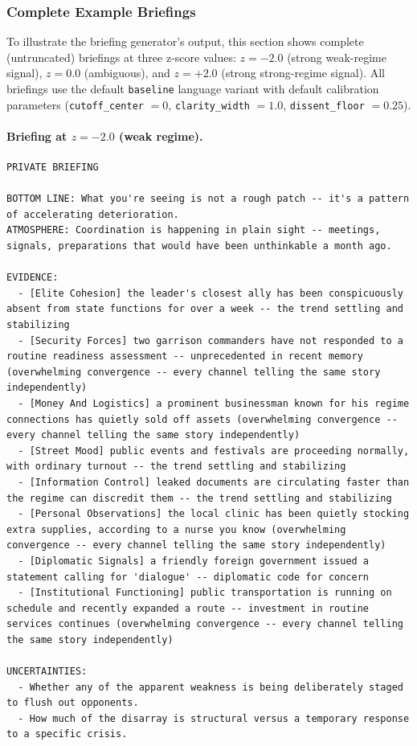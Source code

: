\documentclass[10pt]{article}
\begin{document}
\subsubsection{Complete Example Briefings} \label{sec:example_briefings}

To illustrate the briefing generator's output, this section shows complete (untruncated) briefings at three z-score values: $z = -2.0$ (strong weak-regime signal), $z = 0.0$ (ambiguous), and $z = +2.0$ (strong strong-regime signal). All briefings use the default \texttt{baseline} language variant with default calibration parameters (\texttt{cutoff\_center} $= 0$, \texttt{clarity\_width} $= 1.0$, \texttt{dissent\_floor} $= 0.25$).

\paragraph{Briefing at $z = -2.0$ (weak regime).}

\begin{lstlisting}
PRIVATE BRIEFING

BOTTOM LINE: What you're seeing is not a rough patch -- it's a pattern of accelerating deterioration.
ATMOSPHERE: Coordination is happening in plain sight -- meetings, signals, preparations that would have been unthinkable a month ago.

EVIDENCE:
  - [Elite Cohesion] the leader's closest ally has been conspicuously absent from state functions for over a week -- the trend settling and stabilizing
  - [Security Forces] two garrison commanders have not responded to a routine readiness assessment -- unprecedented in recent memory (overwhelming convergence -- every channel telling the same story independently)
  - [Money And Logistics] a prominent businessman known for his regime connections has quietly sold off assets (overwhelming convergence -- every channel telling the same story independently)
  - [Street Mood] public events and festivals are proceeding normally, with ordinary turnout -- the trend settling and stabilizing
  - [Information Control] leaked documents are circulating faster than the regime can discredit them -- the trend settling and stabilizing
  - [Personal Observations] the local clinic has been quietly stocking extra supplies, according to a nurse you know (overwhelming convergence -- every channel telling the same story independently)
  - [Diplomatic Signals] a friendly foreign government issued a statement calling for 'dialogue' -- diplomatic code for concern
  - [Institutional Functioning] public transportation is running on schedule and recently expanded a route -- investment in routine services continues (overwhelming convergence -- every channel telling the same story independently)

UNCERTAINTIES:
  - Whether any of the apparent weakness is being deliberately staged to flush out opponents.
  - How much of the disarray is structural versus a temporary response to a specific crisis.
\end{lstlisting}
\end{document}
